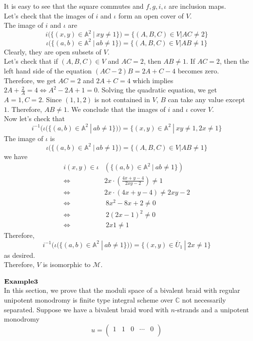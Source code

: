 \begin{example}
It is easy to see that the square commutes and $f,g,i,\iota$ are inclusion maps.
\\
Let's check that the images of $i$ and $\iota$ form an open cover of $V$.\\
The image of $i$ and $\iota$ are
\[
	i( \{(x,y)\in \mathbb{A}^2~|~xy\neq 1 \})=\{(A,B,C)\in V| AC\neq 2\}
\]
\[
	\iota ( \{(a,b)\in \mathbb{A}^2~|~ab\neq 1 \})=\{(A,B,C)\in V| AB\neq 1\}
\]
Clearly, they are open subsets of $V$.\\
Let's check that if $(A,B,C)\in V$ and $AC=2$, then $AB\neq1$. If $AC=2$, then the left hand side of the equation $(AC-2)B=2A+C-4$ becomes zero. Therefore, we get $AC=2$ and $2A+C=4$ which implies $2A+\frac{2}{A}=4\Leftrightarrow A^2-2A+1=0$. Solving the quadratic equation, we get $A=1,C=2$. Since $(1,1,2)$ is not contained in $V$, $B$ can take any value except $1$. Therefore, $AB\neq 1$. We conclude that the images of $i$ and $\iota$ cover $V$.\\
Now let's check that 
\[
	i^{-1}(
	\iota (\{(a,b)\in \mathbb{A}^2~|~ab\neq 1 \})
	)
		=
	\{
	(x,y)\in \mathbb{A}^2~|~
	xy\neq 1,2x\neq 1 	
	\}
\]
The image of $\iota$ is
\[
	\iota ( \{(a,b)\in \mathbb{A}^2~|~ab\neq 1 \})=\{(A,B,C)\in V| AB\neq 1\}
\]
we have
\begin{align*}
i(x,y)\in \iota &(\{(a,b)\in \mathbb{A}^2~|~ab\neq 1 \})\\ \Longleftrightarrow & 2x\cdot (\frac{4x+y-4}{2xy-2})\neq 1\\
\Longleftrightarrow & 2x\cdot(4x+y-4)\neq 2xy-2\\
\Longleftrightarrow &~8x^2-8x+2\neq 0 \\
\Longleftrightarrow &~2(2x-1)^2\neq 0\\
\Longleftrightarrow &~2x1\neq 1 
\end{align*}
Therefore,
\[
	i^{-1}(
	\iota (\{(a,b)\in \mathbb{A}^2~|~ab\neq 1 \})
	)
		=
	\{
	(x,y)\in \overline{U}_1~|~
	2x\neq 1 	
	\}
\]
as desired.\\
Therefore, $V$ is isomorphic to $\mathcal{M}$.\\
\\
$\bf{Example3}$\\
In this section, we prove that the moduli space of a bivalent braid with regular unipotent monodromy is finite type integral scheme over $\mathbb{C}$ not necessarily separated. Suppose we have a bivalent braid word with $n$-strands and a unipotent monodromy
\[
	u=
	\begin{pmatrix}
		1&1&0&\cdots&0\\

\end{pmatrix}\]
\end{example}

